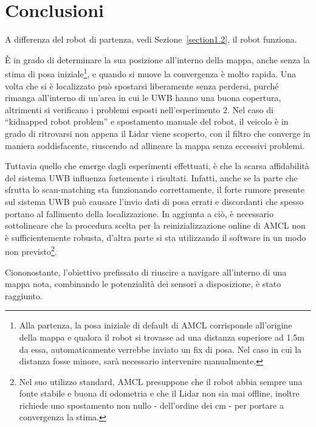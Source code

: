 
\chapter{Conclusioni}
\label{capitolo4}

A differenza del robot di partenza, vedi Sezione~\ref{section1.2}, il robot funziona.

È in grado di determinare la sua posizione all’interno della mappa, anche senza la stima di posa iniziale\footnote{Alla partenza, la posa iniziale di default di AMCL corrisponde all'origine della mappa e qualora il robot si trovasse ad una distanza superiore ad 1.5m da essa, automaticamente verrebbe inviato un fix di posa. Nel caso in cui la distanza fosse minore, sarà necessario intervenire manualmente.}, e quando si muove la convergenza è molto rapida. Una volta che si è localizzato può spostarsi liberamente senza perdersi, purché rimanga all'interno di un'area in cui le UWB hanno una buona copertura, altrimenti si verificano i problemi esposti nell'esperimento 2.
Nel caso di “kidnapped robot problem” e spostamento manuale del robot, il veicolo è in grado di ritrovarsi non appena il Lidar viene scoperto, con il filtro che converge in maniera soddisfacente, riuscendo ad allineare la mappa senza eccessivi problemi.

Tuttavia quello che emerge dagli esperimenti effettuati, è che la scarsa affidabilità del sistema UWB influenza fortemente i risultati.
Infatti, anche se la parte che sfrutta lo scan-matching sta funzionando correttamente, il forte rumore presente sul sistema UWB può causare l'invio dati di posa errati e discordanti che spesso portano al fallimento della localizzazione. In aggiunta a ciò, è necessario sottolineare che la procedura scelta per la reinizializzazione online di AMCL non è sufficientemente robusta, d'altra parte si sta utilizzando il software in un modo non previsto\footnote{Nel suo utilizzo standard, AMCL presuppone che il robot abbia sempre una fonte stabile e buona di odometria e che il Lidar non sia mai offline, inoltre richiede uno spostamento non nullo - dell'ordine dei cm - per portare a convergenza la stima.}. 

Ciononostante, l'obiettivo prefissato di riuscire a navigare all'interno di una mappa nota, combinando le potenzialità dei sensori a disposizione, è stato raggiunto.